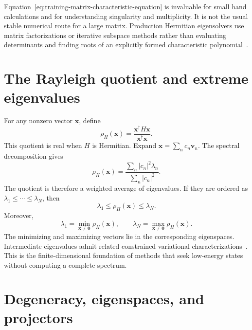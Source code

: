 Equation~\eqref{eq:training-matrix-characteristic-equation} is invaluable for
small hand calculations and for understanding singularity and multiplicity. It
is not the usual stable numerical route for a large matrix. Production
Hermitian eigensolvers use matrix factorizations or iterative subspace methods
rather than evaluating determinants and finding roots of an explicitly formed
characteristic polynomial~\cite{golubVanLoan2013}.

\section{The Rayleigh quotient and extreme eigenvalues}

For any nonzero vector \(\mathbf x\), define
\begin{equation}
  \rho_H(\mathbf x)
  =\frac{\mathbf x^{\dagger}H\mathbf x}
         {\mathbf x^{\dagger}\mathbf x}.
  \label{eq:training-rayleigh-quotient}
\end{equation}
This quotient is real when \(H\) is Hermitian. Expand
\(\mathbf x=\sum_n c_n\mathbf v_n\). The spectral decomposition gives
\begin{equation}
  \rho_H(\mathbf x)
  =\frac{\sum_n|c_n|^2\lambda_n}{\sum_n|c_n|^2}.
  \label{eq:training-rayleigh-weighted-average}
\end{equation}
The quotient is therefore a weighted average of eigenvalues. If they are
ordered as
\(\lambda_1\leq\cdots\leq\lambda_N\), then
\begin{equation}
  \lambda_1
  \leq\rho_H(\mathbf x)
  \leq\lambda_N.
\end{equation}
Moreover,
\begin{equation}
  \lambda_1=\min_{\mathbf x\neq\mathbf0}\rho_H(\mathbf x),
  \qquad
  \lambda_N=\max_{\mathbf x\neq\mathbf0}\rho_H(\mathbf x).
  \label{eq:training-rayleigh-extrema}
\end{equation}
The minimizing and maximizing vectors lie in the corresponding eigenspaces.
Intermediate eigenvalues admit related constrained variational
characterizations~\cite{hornJohnson2013}. This is the finite-dimensional
foundation of methods that seek low-energy states without computing a complete
spectrum.

\section{Degeneracy, eigenspaces, and projectors}

